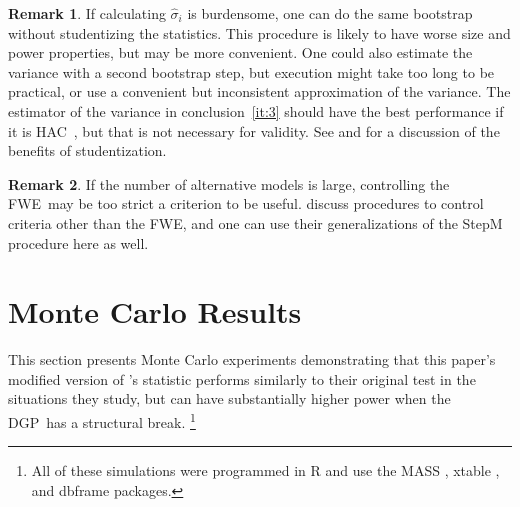 \documentclass[12pt,fleqn]{article}
\newcommand\citepos[2][]{\citeauthor{#2}'s \citeyearpar[#1]{#2}}
\theoremstyle{definition}
\newtheorem{rem}{Remark}
\newcommand{\dgp}{DGP}
\newcommand{\fwe}{FWE}
\newcommand{\hac}{HAC}
\begin{document}
\begin{rem}
  If calculating $\hat{\sigma}_i$ is burdensome, one can do the same
  bootstrap without studentizing the statistics.  This procedure is
  likely to have worse size and power properties, but may be more
  convenient.  One could also estimate the variance with a second
  bootstrap step, but execution might take too long to be practical,
  or use a convenient but inconsistent approximation of the variance.
  The estimator of the variance in conclusion~\ref{it:3} should have the
  best performance if it is \hac\ \cite[the results of][may be
  relevant]{GoK:96}, but that is not necessary for validity.
  See \citet{Han:05} and \citet[Section~4.2]{RoW:05} for a discussion
  of the benefits of studentization.
\end{rem}

\begin{rem}
  If the number of alternative models is large, controlling the \fwe\
  may be too strict a criterion to be useful.  \citet{RSW:08} discuss procedures to
  control criteria other than the \fwe, and one can use their
  generalizations of the StepM procedure here as well.
\end{rem}

\section{Monte Carlo Results}\label{sec:2}
This section presents Monte Carlo experiments demonstrating that
this paper's modified version of \citepos{ClW:07} statistic performs
similarly to their original test in the situations they study, but can
have substantially higher power when the \dgp\ has a structural
break.%
\footnote{All of these simulations were programmed in R
  \citep[version 2.14.0]{R} and use the \textsc{MASS}
  \citep[7.3-22]{VeR:02}, xtable \citep[version 1.6-0]{Dah:09}, and
  dbframe \citep[version 0.2.7]{Cal:10b} packages.} %
\end{document}
